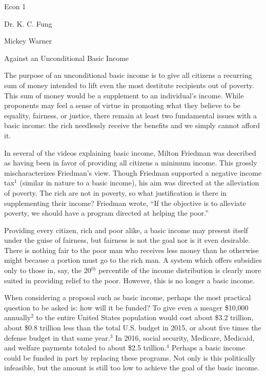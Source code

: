 \documentclass[12pt]{article}
\begin{document}
\noindent Econ 1

\noindent Dr. K. C. Fung
\bigskip

\noindent Mickey Warner

\begin{center}
Against an Unconditional Basic Income
\end{center}

The purpose of an unconditional basic income is to give all citizens a recurring sum of money intended to lift even the most destitute recipients out of poverty. This sum of money would be a supplement to an individual's income. While proponents may feel a sense of virtue in promoting what they believe to be equality, fairness, or justice, there remain at least two fundamental issues with a basic income: the rich needlessly receive the benefits and we simply cannot afford it.

In several of the videos explaining basic income, Milton Friedman was described as having been in favor of providing all citizens a minimum income. This grossly mischaracterizes Friedman's view. Though Friedman supported a negative income tax$^1$ (similar in nature to a basic income), his aim was directed at the alleviation of poverty. The rich are not in poverty, so what justification is there in supplementing their income? Friedman wrote, ``If the objective is to alleviate poverty, we should have a program directed at helping the poor.''

Providing every citizen, rich and poor alike, a basic income may present itself under the guise of fairness, but fairness is not the goal nor is it even desirable. There is nothing fair to the poor man who receives less money than he otherwise might because a portion must go to the rich man. A system which offers subsidies only to those in, say, the 20$^{th}$ percentile of the income distribution is clearly more suited in providing relief to the poor. However, this is no longer a basic income.

When considering a proposal such as basic income, perhaps the most practical question to be asked is: how will it be funded? To give even a meager \$10,000 annually$^2$ to the entire United States population would cost about \$3.2 trillion, about \$0.8 trillion less than the total U.S. budget in 2015, or about five times the defense budget in that same year.$^3$ In 2016, social security, Medicare, Medicaid, and welfare payments totaled to about \$2.5 trillion.$^4$ Perhaps a basic income could be funded in part by replacing these programs. Not only is this politically infeasible, but the amount is still too low to achieve the goal of the basic income.
\end{document}

